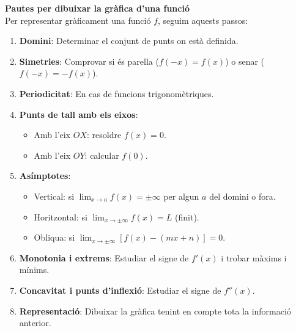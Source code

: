 \documentclass[12pt]{article}
\begin{document}
\begin{concept}
\textbf{Pautes per dibuixar la gràfica d'una funció}\\
Per representar gràficament una funció $f$, seguim aquests passos:
\begin{enumerate}
    \item \textbf{Domini}: Determinar el conjunt de punts on està definida.
    \item \textbf{Simetries}: Comprovar si és parella ($f(-x)=f(x)$) o senar ($f(-x)=-f(x)$).
    \item \textbf{Periodicitat}: En cas de funcions trigonomètriques.
    \item \textbf{Punts de tall amb els eixos}:
        \begin{itemize}
            \item Amb l'eix $OX$: resoldre $f(x)=0$.
            \item Amb l'eix $OY$: calcular $f(0)$.
        \end{itemize}
    \item \textbf{Asímptotes}:
        \begin{itemize}
            \item Vertical: si $\lim_{x\to a} f(x)=\pm\infty$ per algun $a$ del domini o fora.
            \item Horitzontal: si $\lim_{x\to\pm\infty} f(x)=L$ (finit).
            \item Obliqua: si $\lim_{x\to\pm\infty} [f(x)-(mx+n)]=0$.
        \end{itemize}
    \item \textbf{Monotonia i extrems}: Estudiar el signe de $f'(x)$ i trobar màxims i mínims.
    \item \textbf{Concavitat i punts d'inflexió}: Estudiar el signe de $f''(x)$.
    \item \textbf{Representació}: Dibuixar la gràfica tenint en compte tota la informació anterior.
\end{enumerate}
\end{concept}
\end{document}
